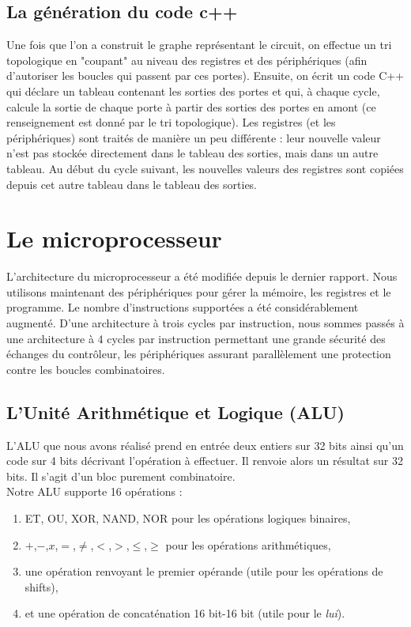 \documentclass[13pt]{article}
\begin{document}
\subsection{La génération du code c++}

Une fois que l'on a construit le graphe représentant le circuit, on effectue un
tri topologique en "coupant" au niveau des registres et des périphériques (afin
d'autoriser les boucles qui passent par ces portes). Ensuite, on écrit un code
C++ qui déclare un tableau contenant les sorties des portes et qui, à chaque
cycle, calcule la sortie de chaque porte à partir des sorties des portes en
amont (ce renseignement est donné par le tri topologique). Les registres (et les
périphériques) sont traités de manière un peu différente : leur nouvelle valeur
n'est pas stockée directement dans le tableau des sorties, mais dans un autre
tableau. Au début du cycle suivant, les nouvelles valeurs des registres sont
copiées depuis cet autre tableau dans le tableau des sorties.

\section{Le microprocesseur}

L'architecture du microprocesseur a été modifiée depuis le dernier rapport.
Nous utilisons maintenant des périphériques pour gérer la mémoire, les registres
et le programme. Le nombre d'instructions supportées a été considérablement 
augmenté. D'une architecture à trois cycles par instruction, nous sommes passés
à une architecture à 4 cycles par instruction permettant une grande sécurité des
échanges du contrôleur, les périphériques assurant parallèlement une protection contre
les boucles combinatoires.

\subsection{L'Unité Arithmétique et Logique (ALU)}

L’ALU que nous avons réalisé prend en entrée deux entiers sur
32 bits ainsi qu’un code sur 4 bits décrivant l’opération à effectuer. Il renvoie
alors un résultat sur 32 bits. Il s’agit d’un bloc purement combinatoire.\\

Notre ALU supporte 16 opérations :

\begin{enumerate}
\item ET, OU, XOR, NAND, NOR pour les opérations logiques binaires,
\item $+$,$-$,$x$,$=$,$\neq$,$<$,$>$,$\leq$,$\geq$ pour les opérations
arithmétiques,
\item une opération renvoyant le premier opérande (utile pour les opérations de
shifts),
\item et une opération de concaténation 16 bit-16 bit (utile pour le
\textit{lui}).
\end{enumerate}  
\end{document}
